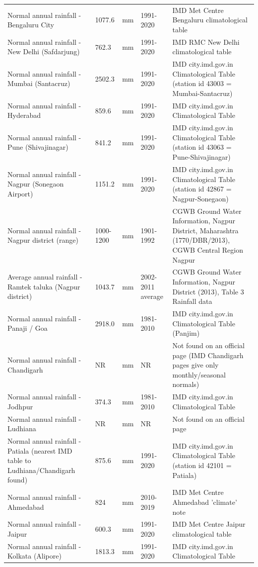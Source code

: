 {\begin{longtable}{p{4.8cm} p{2.3cm} p{1.4cm} p{2.1cm} p{5.2cm}}
Normal annual rainfall - Bengaluru City & 1077.6 & mm & 1991-2020 & IMD Met Centre Bengaluru climatological table\\
Normal annual rainfall - New Delhi (Safdarjung) & 762.3 & mm & 1991-2020 & IMD RMC New Delhi climatological table\\
Normal annual rainfall - Mumbai (Santacruz) & 2502.3 & mm & 1991-2020 & IMD city.imd.gov.in Climatological Table (station id 43003 = Mumbai-Santacruz)\\
Normal annual rainfall - Hyderabad & 859.6 & mm & 1991-2020 & IMD city.imd.gov.in Climatological Table\\
Normal annual rainfall - Pune (Shivajinagar) & 841.2 & mm & 1991-2020 & IMD city.imd.gov.in Climatological Table (station id 43063 = Pune-Shivajinagar)\\
Normal annual rainfall - Nagpur (Sonegaon Airport) & 1151.2 & mm & 1991-2020 & IMD city.imd.gov.in Climatological Table (station id 42867 = Nagpur-Sonegaon)\\
Normal annual rainfall - Nagpur district (range) & 1000-1200 & mm & 1901-1992 & CGWB Ground Water Information, Nagpur District, Maharashtra (1770/DBR/2013), CGWB Central Region Nagpur\\
Average annual rainfall - Ramtek taluka (Nagpur district) & 1043.7 & mm & 2002-2011 average & CGWB Ground Water Information, Nagpur District (2013), Table 3 Rainfall data\\
Normal annual rainfall - Panaji / Goa & 2918.0 & mm & 1981-2010 & IMD city.imd.gov.in Climatological Table (Panjim)\\
Normal annual rainfall - Chandigarh & NR & mm & NR & Not found on an official page (IMD Chandigarh pages give only monthly/seasonal normals)\\
Normal annual rainfall - Jodhpur & 374.3 & mm & 1981-2010 & IMD city.imd.gov.in Climatological Table\\
Normal annual rainfall - Ludhiana & NR & mm & NR & Not found on an official page\\
Normal annual rainfall - Patiala (nearest IMD table to Ludhiana/Chandigarh found) & 875.6 & mm & 1991-2020 & IMD city.imd.gov.in Climatological Table (station id 42101 = Patiala)\\
Normal annual rainfall - Ahmedabad & 824 & mm & 2010-2019 & IMD Met Centre Ahmedabad 'climate' note\\
Normal annual rainfall - Jaipur & 600.3 & mm & 1991-2020 & IMD Met Centre Jaipur climatological table\\
Normal annual rainfall - Kolkata (Alipore) & 1813.3 & mm & 1991-2020 & IMD city.imd.gov.in Climatological Table\\

\end{longtable}}

